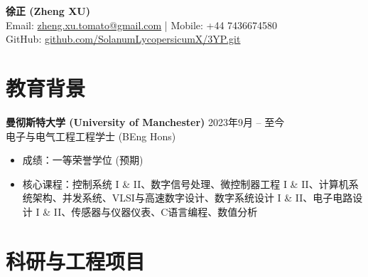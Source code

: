 \documentclass[11pt, a4paper]{article}
\newcommand{\entry}[2]{\textbf{#1} \hfill #2}
\begin{document}
\begin{center}
    {\LARGE \textbf{徐正 (Zheng XU)}} \\[4pt]
    Email: \href{mailto:zheng.xu.tomato@gmail.com}{zheng.xu.tomato@gmail.com} \quad | \quad Mobile: +44 7436674580 \\[2pt]
    GitHub: \href{https://github.com/SolanumLycopersicumX/3YP.git}{github.com/SolanumLycopersicumX/3YP.git}
\end{center}

\section{教育背景}

\entry{曼彻斯特大学 (University of Manchester)}{2023年9月 -- 至今} \\
电子与电气工程工程学士 (BEng Hons)
\begin{itemize}[leftmargin=*, nosep, topsep=2pt]
    \item 成绩：一等荣誉学位 (预期)
    \item 核心课程：控制系统 I \& II、数字信号处理、微控制器工程 I \& II、计算机系统架构、并发系统、VLSI与高速数字设计、数字系统设计 I \& II、电子电路设计 I \& II、传感器与仪器仪表、C语言编程、数值分析
\end{itemize}

\section{科研与工程项目}
\end{document}
